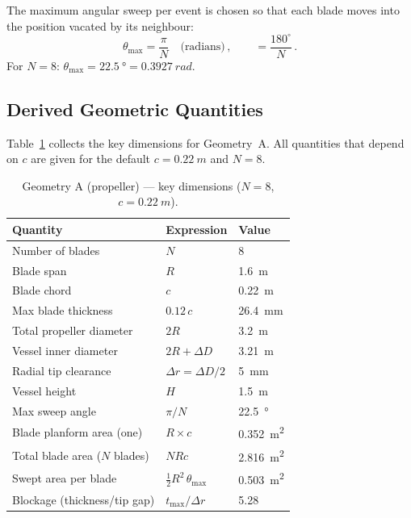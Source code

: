 \documentclass[11pt,a4paper]{article}
\begin{document}
The maximum angular sweep per event is chosen so that each blade moves
into the position vacated by its neighbour:
\begin{equation}
  \theta_\mathrm{max} = \frac{\pi}{N}
  \quad\text{(radians)}\,,
  \qquad
  = \frac{180^\circ}{N}\,.
  \label{eq:theta_max}
\end{equation}
For $N = 8$: $\theta_\mathrm{max} = \SI{22.5}{\degree}
= \SI{0.3927}{rad}$.

\subsection{Derived Geometric Quantities}

Table~\ref{tab:propA} collects the key dimensions for Geometry~A.
All quantities that depend on $c$ are given for the default
$c = \SI{0.22}{m}$ and $N = 8$.

\begin{table}[H]
\centering
\caption{Geometry A (propeller) — key dimensions ($N = 8$,
$c = \SI{0.22}{m}$).}
\label{tab:propA}
\begin{tabular}{lll}
\toprule
Quantity & Expression & Value \\
\midrule
Number of blades       & $N$                           & 8 \\
Blade span             & $R$                           & \SI{1.6}{m} \\
Blade chord            & $c$                           & \SI{0.22}{m} \\
Max blade thickness    & $0.12\,c$                     & \SI{26.4}{mm} \\
Total propeller diameter & $2R$                        & \SI{3.2}{m} \\
Vessel inner diameter  & $2R + \Delta D$               & \SI{3.21}{m} \\
Radial tip clearance   & $\Delta r = \Delta D/2$       & \SI{5}{mm} \\
Vessel height          & $H$                           & \SI{1.5}{m} \\
Max sweep angle        & $\pi / N$                     & \SI{22.5}{\degree} \\
Blade planform area (one) & $R \times c$               & \SI{0.352}{m^2} \\
Total blade area ($N$ blades) & $N R c$                & \SI{2.816}{m^2} \\
Swept area per blade   & $\tfrac{1}{2}R^2\,\theta_\mathrm{max}$
                                                        & \SI{0.503}{m^2} \\
Blockage (thickness/tip gap) & $t_\mathrm{max}/\Delta r$
                                                        & 5.28 \\
\bottomrule
\end{tabular}
\end{table}
\end{document}
